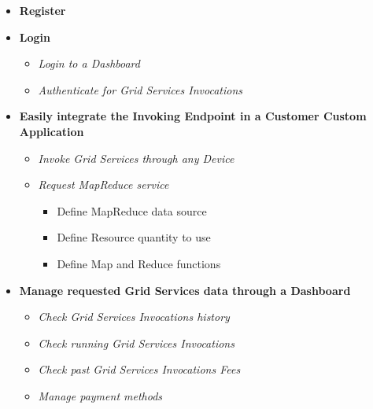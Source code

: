\begin{itemize}
    \item \textbf{Register}\\
    \item \textbf{Login}\\
    \begin{itemize}
        \item \textit{Login to a Dashboard}\\
        \item \textit{Authenticate for Grid Services Invocations}\\
    \end{itemize}
    \item \textbf{Easily integrate the Invoking Endpoint in a Customer Custom Application}\\
    \begin{itemize}
        \item \textit{Invoke Grid Services through any Device}\\
        \item \textit{Request MapReduce service}\\
        \begin{itemize}
            \item Define MapReduce data source\\
            \item Define Resource quantity to use\\
            \item Define Map and Reduce functions\\
        \end{itemize}
    \end{itemize}
    \item \textbf{Manage requested Grid Services data through a Dashboard}\\
    \begin{itemize}
        \item \textit{Check Grid Services Invocations history}\\
        \item \textit{Check running Grid Services Invocations}\\
        \item \textit{Check past Grid Services Invocations Fees}\\
        \item \textit{Manage payment methods}\\
    \end{itemize}
\end{itemize}